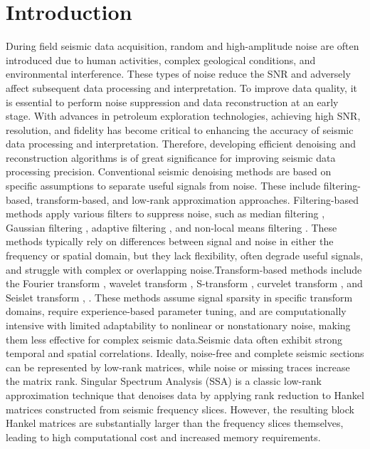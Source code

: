 \documentclass[preprint,12pt]{elsarticle}
\begin{document}
\section{Introduction}
\label{sec1}
During field seismic data acquisition, random and high-amplitude noise are often introduced due to human activities, complex geological conditions, and environmental interference. These types of noise reduce the SNR and adversely affect subsequent data processing and interpretation. To improve data quality, it is essential to perform noise suppression and data reconstruction at an early stage. With advances in petroleum exploration technologies, achieving high SNR, resolution, and fidelity has become critical to enhancing the accuracy of seismic data processing and interpretation. Therefore, developing efficient denoising and reconstruction algorithms is of great significance for improving seismic data processing precision.
Conventional seismic denoising methods are based on specific assumptions to separate useful signals from noise. These include filtering-based, transform-based, and low-rank approximation approaches. Filtering-based methods apply various filters to suppress noise, such as median filtering \cite{bednar83}, Gaussian filtering \cite{wu11}, adaptive filtering \cite{cao18}, and non-local means filtering \cite{buades08}. These methods typically rely on differences between signal and noise in either the frequency or spatial domain, but they lack flexibility, often degrade useful signals, and struggle with complex or overlapping noise.Transform-based methods include the Fourier transform \cite{zhang19}, wavelet transform \cite{xia94}, S-transform \cite{zhao07}, curvelet transform \cite{li20}, and Seislet transform \cite{fomel06}, \cite{liu09}. These methods assume signal sparsity in specific transform domains, require experience-based parameter tuning, and are computationally intensive with limited adaptability to nonlinear or nonstationary noise, making them less effective for complex seismic data.Seismic data often exhibit strong temporal and spatial correlations. Ideally, noise-free and complete seismic sections can be represented by low-rank matrices, while noise or missing traces increase the matrix rank. Singular Spectrum Analysis (SSA) \cite{chen15} is a classic low-rank approximation technique that denoises data by applying rank reduction to Hankel matrices constructed from seismic frequency slices. However, the resulting block Hankel matrices are substantially larger than the frequency slices themselves, leading to high computational cost and increased memory requirements.
\end{document}
